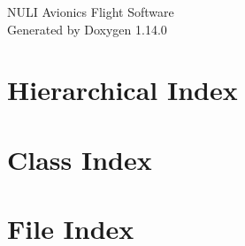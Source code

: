 \documentclass[twoside]{book}
\newcommand{\+}{\discretionary{\mbox{\scriptsize$\hookleftarrow$}}{}{}}
\newcommand{\clearemptydoublepage}{%
    \newpage{\pagestyle{empty}\cleardoublepage}%
  }
\begin{document}
  \raggedbottom
    \hypersetup{pageanchor=false,
                bookmarksnumbered=true,
                pdfencoding=unicode
               }
  \begin{titlepage}
  \vspace*{7cm}
  \begin{center}%
  {\Large NULI Avionics Flight Software}\\
  \vspace*{1cm}
  {\large Generated by Doxygen 1.14.0}\\
  \end{center}
  \end{titlepage}
  \clearemptydoublepage
  \tableofcontents
  \clearemptydoublepage
  \hypersetup{pageanchor=true}


\chapter{Hierarchical Index}

\chapter{Class Index}

\chapter{File Index}

\end{document}
